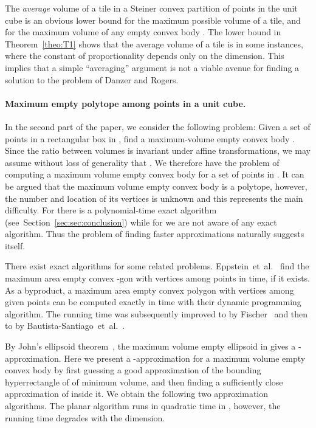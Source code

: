 \documentclass[11pt]{article}
\def\etal{{et~al.}}
\newcommand{\secref}[1]{Section~\ref{sec:#1}}
\newcommand{\thmref}[1]{Theorem~\ref{theo:#1}}
\begin{document}
The \emph{average} volume of a tile in a Steiner convex partition of 
points in the unit cube  is an obvious lower bound for the
maximum possible volume of a tile, and for the maximum volume of any
empty convex body . The lower bound 
in \thmref{T1} shows that the average volume of a tile is
 in some instances, where the constant of proportionality
depends only on the dimension.  This implies that a simple
``averaging'' argument is not a viable avenue for finding a solution
to the problem of Danzer and Rogers.

\paragraph{Maximum empty polytope among  points in a
   unit cube.}  In the second part of the paper, we consider the
following problem: Given a set of  points in a rectangular box  in
, find a maximum-volume empty convex body . Since
the ratio between volumes is invariant under affine transformations,
we may assume without loss of generality that .  We
therefore have the problem of computing a maximum volume empty convex
body  for a set of  points in .
It can be argued that the maximum volume empty convex body is a polytope,
however, the number and location of its vertices is unknown and this
represents the main difficulty.
For  there is a polynomial-time exact algorithm (see~\secref{sec:conclusion})
while for  we are not aware of any exact algorithm.
Thus the problem of finding faster approximations naturally suggests itself.

There exist exact algorithms for some related problems.
Eppstein~\etal~\cite{EORW92} find the maximum area empty convex
-gon with vertices among  points in  time, if it exists.
As a byproduct, a maximum area empty convex polygon with vertices among 
given points can be computed exactly in  time with their dynamic
programming algorithm. The running time was subsequently improved to 
by Fischer~\cite{Fis97} and then to   by Bautista-Santiago~\etal~\cite{BDL+11}.

By John's ellipsoid theorem~\cite{Ma02}, the maximum volume empty
ellipsoid in  gives a -appro\-xi\-ma\-tion.
Here we present a -approximation for a maximum volume empty convex
body  by first guessing a good approximation of the bounding
hyperrectangle of  of minimum volume,
and then finding a sufficiently close approximation of  inside it.
We obtain the following two approximation algorithms.
The planar algorithm runs in quadratic time in ,
however, the running time degrades with the dimension.
\end{document}
